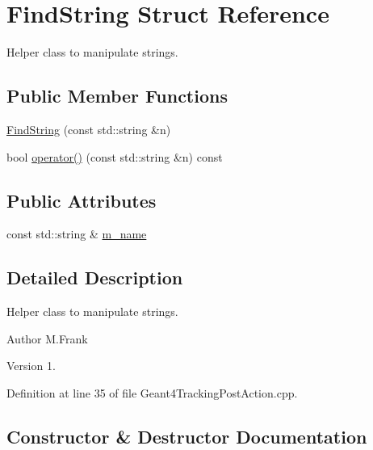 \hypertarget{struct_find_string}{}\section{Find\+String Struct Reference}
\label{struct_find_string}


Helper class to manipulate strings.  


\subsection*{Public Member Functions}
\begin{DoxyCompactItemize}
\item 
\hyperlink{struct_find_string_a355f278ab247210e03e1200077c276ec}{Find\+String} (const std\+::string \&n)
\item 
bool \hyperlink{struct_find_string_a73fa4402f77de5ffa983733c2092ad1f}{operator()} (const std\+::string \&n) const
\end{DoxyCompactItemize}
\subsection*{Public Attributes}
\begin{DoxyCompactItemize}
\item 
const std\+::string \& \hyperlink{struct_find_string_a7acb1627655d24666e9107df3b60441a}{m\+\_\+name}
\end{DoxyCompactItemize}


\subsection{Detailed Description}
Helper class to manipulate strings. 

\begin{DoxyAuthor}{Author}
M.\+Frank 
\end{DoxyAuthor}
\begin{DoxyVersion}{Version}
1. 
\end{DoxyVersion}


Definition at line 35 of file Geant4\+Tracking\+Post\+Action.\+cpp.



\subsection{Constructor \& Destructor Documentation}
\hypertarget{struct_find_string_a355f278ab247210e03e1200077c276ec}{}\label{struct_find_string_a355f278ab247210e03e1200077c276ec} 
